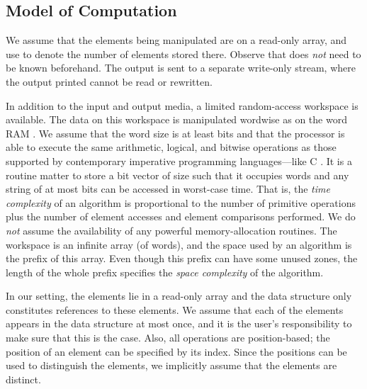 \documentclass[final,onetabnum,onefignum,onethmnum]{siamltex}
\begin{document}
\subsection{Model of Computation} 
We assume that the elements being manipulated are on a read-only array, 
and use  to denote the number of elements stored there.  
Observe that  does \emph{not} need to be known beforehand.  
The output is sent to a separate write-only stream, 
where the output printed cannot be read or rewritten. 

In addition to the input and output media, a limited
random-access workspace is available.  The data on this workspace is
manipulated wordwise as on the word RAM \cite{Hag98}. We assume that
the word size  is at least  bits and that the
processor is able to execute the same arithmetic, logical, and bitwise
operations as those supported by contemporary imperative programming
languages---like C \cite{KR88}.  It is a routine matter \cite[Section
  7.1.3]{Knu11} to store a bit vector of size  such that it
occupies  words and any string of at most  bits can be
accessed in  worst-case time.  That is, the \emph{time
  complexity} of an algorithm is proportional to the number of
primitive operations plus the number of element accesses and element
comparisons performed.
We do \emph{not} assume the availability of any powerful memory-allocation
routines. The workspace is an infinite array (of words), 
and the space used by an algorithm is the prefix of this array. 
Even though this prefix can have some unused zones, the length of
the whole prefix specifies the \emph{space complexity} of the algorithm. 

In our setting, the elements lie in a read-only array and the data
structure only constitutes references to these elements. We assume
that each of the elements appears in the data structure at most once,
and it is the user's responsibility to make sure that this is the
case. Also, all operations are position-based; the position of an
element can be specified by its index.  Since the
positions can be used to distinguish the elements, we implicitly
assume that the elements are distinct.
\end{document}
